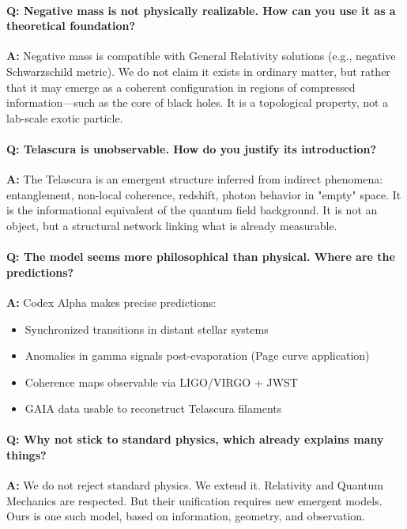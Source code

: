 \documentclass[12pt]{article}
\begin{document}
\paragraph{Q: Negative mass is not physically realizable. How can you use it as a theoretical foundation?}
\textbf{A:} Negative mass is compatible with General Relativity solutions (e.g., negative Schwarzschild metric). We do not claim it exists in ordinary matter, but rather that it may emerge as a coherent configuration in regions of compressed information—such as the core of black holes. It is a topological property, not a lab-scale exotic particle.

\paragraph{Q: Telascura is unobservable. How do you justify its introduction?}
\textbf{A:} The Telascura is an emergent structure inferred from indirect phenomena: entanglement, non-local coherence, redshift, photon behavior in "empty" space. It is the informational equivalent of the quantum field background. It is not an object, but a structural network linking what is already measurable.

\paragraph{Q: The model seems more philosophical than physical. Where are the predictions?}
\textbf{A:} Codex Alpha makes precise predictions:
\begin{itemize}
    \item Synchronized transitions in distant stellar systems
    \item Anomalies in gamma signals post-evaporation (Page curve application)
    \item Coherence maps observable via LIGO/VIRGO + JWST
    \item GAIA data usable to reconstruct Telascura filaments
\end{itemize}

\paragraph{Q: Why not stick to standard physics, which already explains many things?}
\textbf{A:} We do not reject standard physics. We extend it. Relativity and Quantum Mechanics are respected. But their unification requires new emergent models. Ours is one such model, based on information, geometry, and observation.
\end{document}

